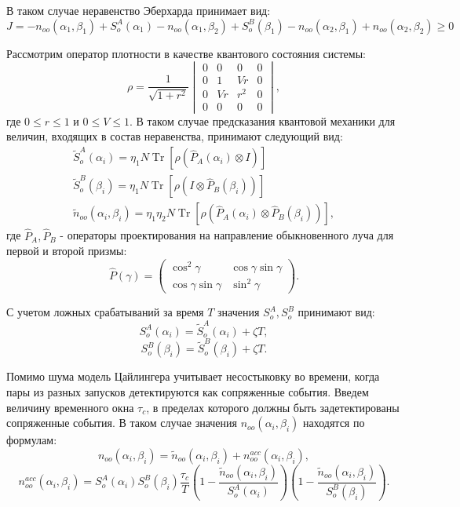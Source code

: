 \documentclass[%
master,         %
subf,           %
href,           %
colorlinks=true %
]{disser}
\DeclareMathOperator{\Tr}{Tr}
\numberwithin{equation}{section}
\numberwithin{figure}{section}
\begin{document}
В таком случае неравенство Эберхарда принимает вид:
\begin{equation}
J = -n_{oo}(\alpha_1, \beta_1) + S_o^A(\alpha_1) - n_{oo}(\alpha_1, \beta_2) + S_o^B(\beta_1) - n_{oo}(\alpha_2, \beta_1) + n_{oo}(\alpha_2, \beta_2) \geq 0
\label{eq:Zeilinger_J}
\end{equation}

Рассмотрим оператор плотности в качестве квантового состояния системы:
\[
\rho = \frac{1}{\sqrt{1+r^2}}
\begin{vmatrix}
0 & 0 & 0 & 0\\
0 & 1 & Vr & 0\\
0 & Vr & r^2 & 0\\
0 & 0 & 0 & 0
\end{vmatrix},
\]
где $0 \leq r \leq 1$ и $0 \leq V \leq 1$.
В таком случае предсказания квантовой механики для величин, входящих в состав неравенства, принимают следующий вид:
\begin{eqnarray*}
\tilde{S}_o^A(\alpha_i) = \eta_1 N \Tr[\rho(\hat{P}_A(\alpha_i) \otimes I)]\\
\tilde{S}_o^B(\beta_i) = \eta_1 N \Tr[\rho(I \otimes \hat{P}_B(\beta_i))]\\
\tilde{n}_{oo}(\alpha_i, \beta_i) = \eta_1\eta_2 N \Tr[\rho(\hat{P}_A(\alpha_i) \otimes \hat{P}_B(\beta_i))],
\end{eqnarray*}
где $\hat{P}_A, \hat{P}_B$ - операторы проектирования на направление обыкновенного луча для первой и второй призмы:
\[
\hat{P}(\gamma) = 
\begin{pmatrix}
\cos^2\gamma & \cos\gamma\sin\gamma\\
\cos\gamma\sin\gamma & \sin^2\gamma
\end{pmatrix}.
\]

С учетом ложных срабатываний за время $T$ значения $S_o^A, S_o^B$ принимают вид:
\[
S_o^A(\alpha_i) = \tilde{S}_o^A(\alpha_i) + \zeta T,
\]
\[
S_o^B(\beta_i) = \tilde{S}_o^B(\beta_i) + \zeta T.
\]

Помимо шума модель Цайлингера учитывает несостыковку во времени, когда пары из разных запусков детектируются как сопряженные события. Введем величину временного окна $\tau_c$, в пределах которого должны быть задетектированы сопряженные события. В таком случае значения $n_{oo}(\alpha_i, \beta_i)$ находятся по формулам:
\[
n_{oo}(\alpha_i, \beta_i) = \tilde{n}_{oo}(\alpha_i, \beta_i) + n_{oo}^{acc}(\alpha_i, \beta_i),
\]
\[
n_{oo}^{acc}(\alpha_i, \beta_i) = S_o^A(\alpha_i)S_o^B(\beta_i)\frac{\tau_c}{T}\left(1 - \frac{\tilde{n}_{oo}(\alpha_i, \beta_i)}{S_o^A(\alpha_i)}\right) \left( 1 - \frac{\tilde{n}_{oo}(\alpha_i, \beta_i)}{S_o^B(\beta_i)}\right).
\]
\end{document}
